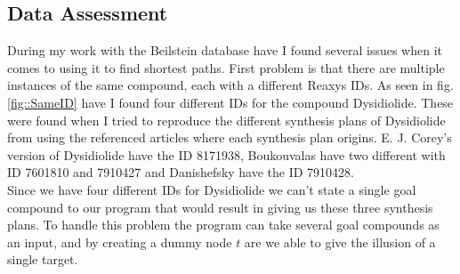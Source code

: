 \documentclass[a4paper,10pt,titlepage]{paper}
\begin{document}
\subsection{Data Assessment}
During my work with the Beilstein database have I found several issues when it comes to using it to find shortest paths.
First problem is that there are multiple instances of the same compound, each with a different Reaxys IDs. As seen in fig.\ref{fig::SameID} have I found four different IDs for the compound Dysidiolide. These were found when I tried to reproduce the different synthesis plans of Dysidiolide from \cite{SynthesisPlans} using the referenced articles where each synthesis plan origins. E. J. Corey's version of Dysidiolide have the ID 8171938, Boukouvalas have two different with ID 7601810 and 7910427 and Danishefsky have the ID 7910428. \\
Since we have four different IDs for Dysidiolide we can't state a single goal compound to our program that would result in giving us these three synthesis plans. To handle this problem the program can take several goal compounds as an input, and by creating a dummy node $t$ are we able to give the illusion of a single target.
\end{document}
